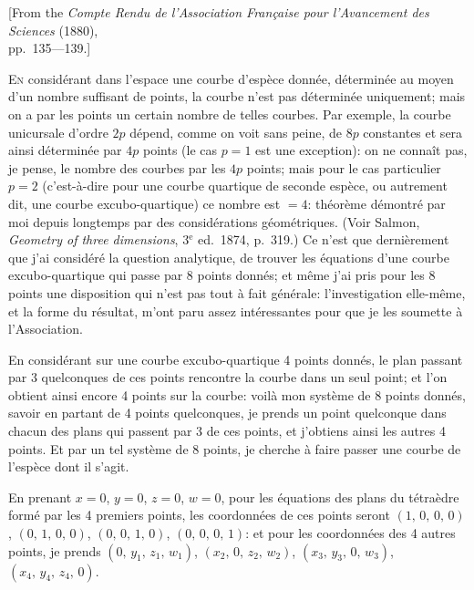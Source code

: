 \documentclass[11pt,a4paper]{book}
\begin{document}
\begin{center}
[From the \textit{Compte Rendu de l'Association Fran\c{c}aise pour l'Avancement des Sciences} (1880),\\ pp.~135---139.]
\end{center}
\medskip

\textsc{En} consid\'erant dans l'espace une courbe d'esp\`ece donn\'ee, d\'etermin\'ee au moyen d'un nombre suffisant de points, la courbe n'est pas d\'etermin\'ee uniquement; mais on a par les points un certain nombre de telles courbes. Par exemple, la courbe unicursale d'ordre $2p$ d\'epend, comme on voit sans peine, de $8p$ constantes et sera ainsi d\'etermin\'ee par $4p$ points (le cas $p=1$ est une exception): on ne conna\^it pas, je pense, le nombre des courbes par les $4p$ points; mais pour le cas particulier $p=2$ (c'est-\`a-dire pour une courbe quartique de seconde esp\`ece, ou autrement dit, une courbe excubo-quartique) ce nombre est $=4$: th\'eor\`eme d\'emontr\'e par moi depuis longtemps par des consid\'erations g\'eom\'etriques. (Voir Salmon, \textit{Geometry of three dimensions}, 3$^\text{e}$ ed.\ 1874, p.~319.) Ce n'est que derni\`erement que j'ai consid\'er\'e la question analytique, de trouver les \'equations d'une courbe excubo-quartique qui passe par 8 points donn\'es; et m\^eme j'ai pris pour les 8 points une disposition qui n'est pas tout \`a fait g\'en\'erale: l'investigation elle-m\^eme, et la forme du r\'esultat, m'ont paru assez int\'eressantes pour que je les soumette \`a l'Association.

En consid\'erant sur une courbe excubo-quartique 4 points donn\'es, le plan passant par 3 quelconques de ces points rencontre la courbe dans un seul point; et l'on obtient ainsi encore 4 points sur la courbe: voil\`a mon syst\`eme de 8 points donn\'es, savoir en partant de 4 points quelconques, je prends un point quelconque dans chacun des plans qui passent par 3 de ces points, et j'obtiens ainsi les autres 4 points. Et par un tel syst\`eme de 8 points, je cherche \`a faire passer une courbe de l'esp\`ece dont il s'agit.

En prenant $x=0$, $y=0$, $z=0$, $w=0$, pour les \'equations des plans du t\'etra\`edre form\'e par les 4 premiers points, les coordonn\'ees de ces points seront $(1,\, 0,\, 0,\, 0)$, $(0,\, 1,\, 0,\, 0)$, $(0,\, 0,\, 1,\, 0)$, $(0,\, 0,\, 0,\, 1)$: et pour les coordonn\'ees des 4 autres points, je prends $(0,\, y_1,\, z_1,\, w_1)$, $(x_2,\, 0,\, z_2,\, w_2)$, $(x_3,\, y_3,\, 0,\, w_3)$, $(x_4,\, y_4,\, z_4,\, 0)$.
\end{document}
